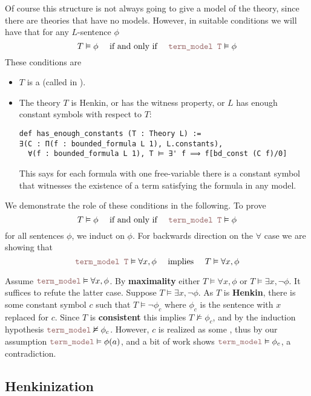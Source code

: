 Of course this structure is not always going to give a model of the
theory, since there are theories that have no models.
However, in suitable conditions we will have that for any $L$-sentence $\phi$
\[
  T \vDash \phi \quad \text{ if and only if } \quad
  \code{term\_model T} \vDash \phi
\]
These conditions are
\begin{itemize}
  \item $T$ is a 
        (called  in ).
  \item The theory $T$ is Henkin, or has the witness property,
        or $L$ has enough constant symbols with respect to $T$:
\begin{lstlisting}
def has_enough_constants (T : Theory L) :=
∃(C : Π(f : bounded_formula L 1), L.constants),
  ∀(f : bounded_formula L 1), T ⊨ ∃' f ⟹ f[bd_const (C f)/0] \end{lstlisting}
        This says for each formula with one free-variable
        there is a constant symbol that witnesses the
        existence of a term satisfying the formula in any model.
\end{itemize}

We demonstrate the role of these conditions in the following.
To prove
\[ T \vDash \phi \quad \text{ if and only if } \quad
  \code{term\_model T} \vDash \phi \]
for all sentences $\phi$, we induct on $\phi$.
For backwards direction on the $\forall$ case
we are showing that
\[ \code{term\_model T} \vDash \forall x, \phi \quad \text{ implies }
  \quad T \vDash \forall x, \phi \]

Assume $\code{term\_model} \vDash \forall x, \phi$.
By \textbf{maximality} either $T \vDash \forall x, \phi$ or
$T \vDash \exists x, \neg \phi$.
It suffices to refute the latter case.
Suppose $T \vDash \exists x, \neg \phi$.
As $T$ is \textbf{Henkin},
there is some constant symbol $c$ such that $T \vDash \neg \phi_{c}$
where $\phi_{c}$ is the sentence with $x$ replaced for $c$.
Since $T$ is \textbf{consistent} this implies $T \nvDash \phi_{c}$,
and by the induction hypothesis $\code{term\_model} \nvDash \phi_{c}$.
However, $c$ is realized as some ,
thus by our assumption $\code{term\_model} \vDash \phi(a)$,
and a bit of work shows $\code{term\_model} \vDash \phi_{c}$,
a contradiction.

\subsection{Henkinization}

